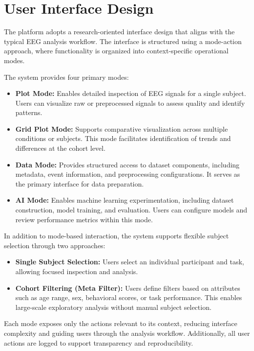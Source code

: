 \section{User Interface Design}
\label{sec:ui-design}

The platform adopts a research-oriented interface design that aligns with the typical EEG analysis workflow. The interface is structured using a mode-action approach, where functionality is organized into context-specific operational modes.
\vspace{0.5em}

\noindent
The system provides four primary modes:

\begin{itemize}[leftmargin=*]
    \item \textbf{Plot Mode:} Enables detailed inspection of EEG signals for a single subject. Users can visualize raw or preprocessed signals to assess quality and identify patterns. 
    \item \textbf{Grid Plot Mode:} Supports comparative visualization across multiple conditions or subjects. This mode facilitates identification of trends and differences at the cohort level. 
    \item \textbf{Data Mode:} Provides structured access to dataset components, including metadata, event information, and preprocessing configurations. It serves as the primary interface for data preparation. 
    \item \textbf{AI Mode:} Enables machine learning experimentation, including dataset construction, model training, and evaluation. Users can configure models and review performance metrics within this mode. 
\end{itemize}

\noindent
In addition to mode-based interaction, the system supports flexible subject selection through two approaches:

\begin{itemize}[leftmargin=*]
    \item \textbf{Single Subject Selection:} Users select an individual participant and task, allowing focused inspection and analysis.
    \item \textbf{Cohort Filtering (Meta Filter):} Users define filters based on attributes such as age range, sex, behavioral scores, or task performance. This enables large-scale exploratory analysis without manual subject selection. 
\end{itemize}

Each mode exposes only the actions relevant to its context, reducing interface complexity and guiding users through the analysis workflow. Additionally, all user actions are logged to support transparency and reproducibility.
\vspace{0.5em}

